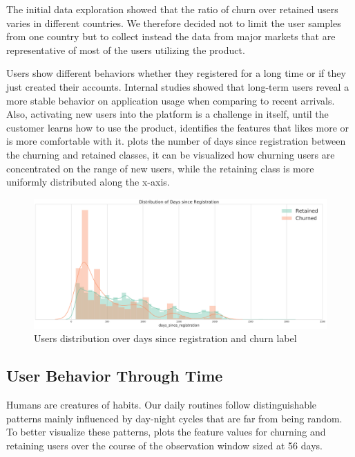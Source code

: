 \documentclass{kththesis}
\begin{document}
The initial data exploration showed that the ratio of churn over retained users varies in different countries. We therefore decided not to limit the user samples from one country but to collect instead the data from major markets that are representative of most of the users utilizing the product.

Users show different behaviors whether they registered for a long time or if they just created their accounts. Internal studies showed that long-term users reveal a more stable behavior on application usage when comparing to recent arrivals. Also, activating new users into the platform is a challenge in itself, until the customer learns how to use the product, identifies the features that likes more or is more comfortable with it.  plots the number of days since registration between the churning and retained classes, it can be visualized how churning users are concentrated on the range of new users, while the retaining class is more uniformly distributed along the x-axis.

	\begin{figure}[h]
    \centering
    \includegraphics[width=1.0\textwidth,keepaspectratio]{figures/days_since_reg.pdf}
    \caption{Users distribution over days since registration and churn label}
    \label{fig:dayssinceregdist}
	\end{figure}

\subsection{User Behavior Through Time}

Humans are creatures of habits. Our daily routines follow distinguishable patterns mainly influenced by day-night cycles that are far from being random. To better visualize these patterns,  plots the feature values for churning and retaining users over the course of the observation window sized at 56 days. 
\end{document}
